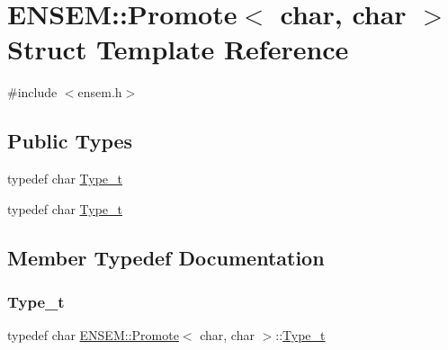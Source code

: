 \hypertarget{structENSEM_1_1Promote_3_01char_00_01char_01_4}{}\section{E\+N\+S\+EM\+:\+:Promote$<$ char, char $>$ Struct Template Reference}
\label{structENSEM_1_1Promote_3_01char_00_01char_01_4}


{\ttfamily \#include $<$ensem.\+h$>$}

\subsection*{Public Types}
\begin{DoxyCompactItemize}
\item 
typedef char \mbox{\hyperlink{structENSEM_1_1Promote_3_01char_00_01char_01_4_a3353ceefb3e26f60983a352e42d691ed}{Type\+\_\+t}}
\item 
typedef char \mbox{\hyperlink{structENSEM_1_1Promote_3_01char_00_01char_01_4_a3353ceefb3e26f60983a352e42d691ed}{Type\+\_\+t}}
\end{DoxyCompactItemize}


\subsection{Member Typedef Documentation}
\mbox{\label{structENSEM_1_1Promote_3_01char_00_01char_01_4_a3353ceefb3e26f60983a352e42d691ed}} 
\subsubsection{\texorpdfstring{Type\_t}{Type\_t}\hspace{0.1cm}{\footnotesize\ttfamily [1/2]}}
{\footnotesize\ttfamily typedef char \mbox{\hyperlink{structENSEM_1_1Promote}{E\+N\+S\+E\+M\+::\+Promote}}$<$ char, char $>$\+::\mbox{\hyperlink{structENSEM_1_1Promote_3_01char_00_01char_01_4_a3353ceefb3e26f60983a352e42d691ed}{Type\+\_\+t}}}

\mbox{\label{structENSEM_1_1Promote_3_01char_00_01char_01_4_a3353ceefb3e26f60983a352e42d691ed}} 
